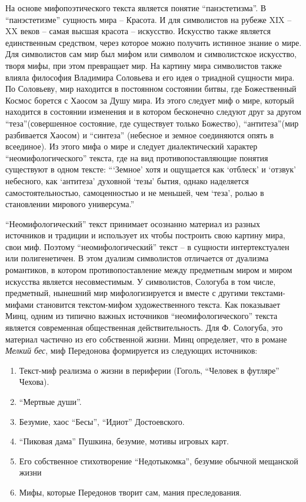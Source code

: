 \documentclass[12pt,a4paper]{article}
\begin{document}
На основе мифопоэтического текста является понятие \enquote{панэстетизма}. В \enquote{панэстетизме} сущность мира -- Красота. И для символистов на рубеже XIX -- XX веков -- самая высшая красота -- искусство. Искусство также является единственным средством, через которое можно получить истинное знание о мире. Для символистов сам мир был мифом или символом и символистское искусство, творя мифы, при этом превращает мир. На картину мира символистов также влияла философия Владимира Соловьева и его идея о триадной сущности мира. По Соловьеву, мир находится в постоянном состоянии битвы, где Божественный Космос борется с Хаосом за Душу мира. Из этого следует миф о мире, который находится в состоянии изменения и в котором бесконечно следуют друг за другом \enquote{теза}(совершенное состояние, где существует только Божество), \enquote{антитеза}(мир разбивается Хаосом) и  \enquote{синтеза} (небесное и земное соединяются опять в всеединое). Из этого мифа о мире и следует диалектический характер \enquote{неомифологического} текста, где на вид противопоставляющие понятия существуют в одном тексте: \enquote{\enquote{Земное} хотя и ощущается как \enquote{отблеск} и \enquote{отзвук} небесного, как \enquote{антитеза} духовной \enquote{тезы} бытия, однако наделяется самостоятельностью, самоценностью и не меньшей, чем \enquote{теза}, ролью в становлении мирового универсума.} \Parencite[71.]{mints2004}


\enquote{Неомифологический} текст принимает осознанно материал из разных источников и традиции и использует их чтобы построить свою картину мира, свои миф. Поэтому \enquote{неомифологический} текст -- в сущности интертекстуален или полигенетичен. В этом дуализм символистов отличается от дуализма романтиков, в котором противопоставление между предметным миром и миром искусства является несовместимым. У символистов, Сологуба в том числе, предметный, нынешний мир мифологизируется и вместе с другими текстами-мифами становится текстом-мифом художественного текста. Как показывает Минц, одним из типично важных источников \enquote{неомифологического} текста является современная общественная действительность. Для Ф. Сологуба, это материал частично из его собственной жизни. Минц определяет, что в романе \emph{Мелкий бес}, миф Передонова формируется из следующих источников:

\begin{enumerate}[itemsep=0mm, label=\asbuk*)]
\item Текст-миф реализма о жизни в периферии (Гоголь, \enquote{Человек в футляре} Чехова).
\item \enquote{Мертвые души}.
\item Безумие, хаос \enquote{Бесы}, \enquote{Идиот} Достоевского.
\item \enquote{Пиковая дама} Пушкина, безумие, мотивы игровых карт.
\item Его собственное стихотворение \enquote{Недотыкомка}, безумие обычной мещанской жизни
\item Мифы, которые Передонов творит сам, мания преследования.
\end{enumerate}
\end{document}
